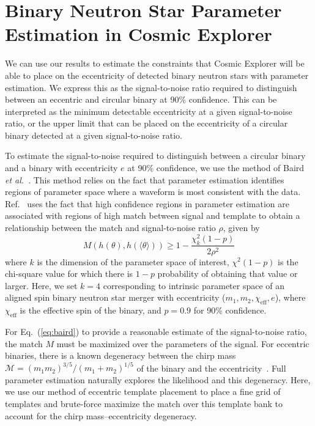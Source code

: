 \section{\label{s:3G-pe}Binary Neutron Star Parameter Estimation in Cosmic Explorer}

We can use our results to estimate the constraints that Cosmic Explorer will be able to place on the eccentricity of detected binary neutron stars with parameter estimation. We express this as the signal-to-noise ratio required to distinguish between an eccentric and circular binary at 90\% confidence. This can be interpreted as the minimum detectable eccentricity at a given signal-to-noise ratio, or the upper limit that can be placed on the eccentricity of a circular binary detected at a given signal-to-noise ratio.

To estimate the signal-to-noise required to distinguish between a circular binary and a binary with eccentricity $e$ at 90\% confidence, we use the method of Baird \textit{et al.}~\cite{Baird:2012cu}. This method relies on the fact that parameter estimation identifies regions of parameter space where a waveform is most consistent with the data. Ref.~\cite{Baird:2012cu} uses the fact that high confidence regions in parameter estimation are associated with regions of high match between signal and template to obtain a relationship between the match and signal-to-noise ratio $\rho$, given by
\begin{equation}
    M(h(\theta),h(\langle\theta\rangle)) \geq 1 - \frac{\chi_k^2(1-p)}{2\rho^2}
    \label{eq:baird}
\end{equation}
where $k$ is the dimension of the parameter space of interest, $\chi^2(1 - p)$ is the chi-square value for which there is $1 - p$ probability of obtaining that value or larger. Here, we set $k=4$ corresponding to intrinsic parameter space of an aligned spin binary neutron star merger with eccentricity ($m_1, m_2, \chi_\mathrm{eff}, e$), where $\chi_\mathrm{eff}$ is the effective spin of the binary, and $p = 0.9$ for 90\% confidence.

For Eq.~(\ref{eq:baird}) to provide a reasonable estimate of the signal-to-noise ratio, the match $M$ must be maximized over the parameters of the signal. For eccentric binaries, there is a known degeneracy between the chirp mass $\mathcal{M} = (m_1  m_2)^{3/5} / (m_1 + m_2)^{1/5}$ of the binary and the eccentricity~\cite{Martel:1999tm,Lenon:2020oza}. Full parameter estimation naturally explores the likelihood and this degeneracy. Here, we use our method of eccentric template placement to place a fine grid of templates and brute-force maximize the match over this template bank to account for the chirp mass--eccentricity degeneracy.

